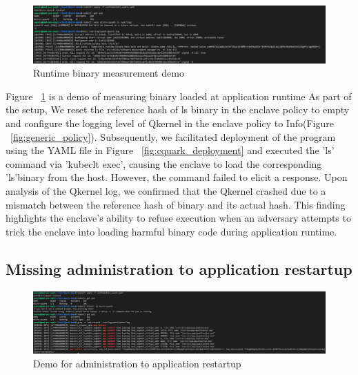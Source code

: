  \begin{figure}[H]
    \centering
    \includegraphics[width=1\textwidth]{images/cquark_runtime_runtime_binary_measurement_demo.png}
    \caption[Runtime binary measurement demo]{Runtime binary measurement demo}
    \label{fig:cquark_runtime_runtime_binary_measurement_demo}
\end{figure}


Figure ~\ref{fig:cquark_runtime_runtime_binary_measurement_demo} is a demo of measuring binary loaded at application runtime  As part of the setup, We reset the reference hash of ls binary in the enclave policy to empty and configure the logging level of Qkernel in the enclave policy to 
Info(Figure ~\ref{fig:generic_policy}). Subsequently, we facilitated deployment of the program using the YAML file in Figure ~\ref{fig:cquark_deployment} and executed the 'ls' command via 'kubeclt exec'\cite*{kubectl}, causing the enclave to load the 
corresponding 'ls'binary from the host. However, the command failed to elicit a response. Upon analysis of the Qkernel log, we confirmed that the Qkernel crashed due to a mismatch between the reference hash of  binary and its actual hash. 
This finding highlights the enclave's ability to refuse execution when an adversary attempts to trick the enclave into loading harmful binary code during application runtime.

\subsection{Missing administration to application restartup}

\begin{figure}[H]
    \centering
    \includegraphics[width=1\textwidth]{images/cquark_restart_administration_demo.png}
    \caption[Demo for  administration to application restartup]{Demo for  administration to application restartup}
    \label{fig:cquark_restart_administration_demo}
\end{figure}



